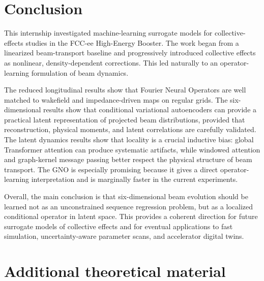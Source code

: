 \documentclass[11pt,a4paper]{article}
\begin{document}
\begin{sloppypar}
\section{Conclusion}
\label{sec:conclusion}

This internship investigated machine-learning surrogate models for collective-effects studies in the FCC-ee High-Energy Booster. The work began from a linearized beam-transport baseline and progressively introduced collective effects as nonlinear, density-dependent corrections. This led naturally to an operator-learning formulation of beam dynamics.

The reduced longitudinal results show that Fourier Neural Operators are well matched to wakefield and impedance-driven maps on regular grids. The six-dimensional results show that conditional variational autoencoders can provide a practical latent representation of projected beam distributions, provided that reconstruction, physical moments, and latent correlations are carefully validated. The latent dynamics results show that locality is a crucial inductive bias: global Transformer attention can produce systematic artifacts, while windowed attention and graph-kernel message passing better respect the physical structure of beam transport. The GNO is especially promising because it gives a direct operator-learning interpretation and is marginally faster in the current experiments.

Overall, the main conclusion is that six-dimensional beam evolution should be learned not as an unconstrained sequence regression problem, but as a localized conditional operator in latent space. This provides a coherent direction for future surrogate models of collective effects and for eventual applications to fast simulation, uncertainty-aware parameter scans, and accelerator digital twins.

\newpage
\printbibliography

\appendix
\section{Additional theoretical material}


\end{sloppypar}
\end{document}
